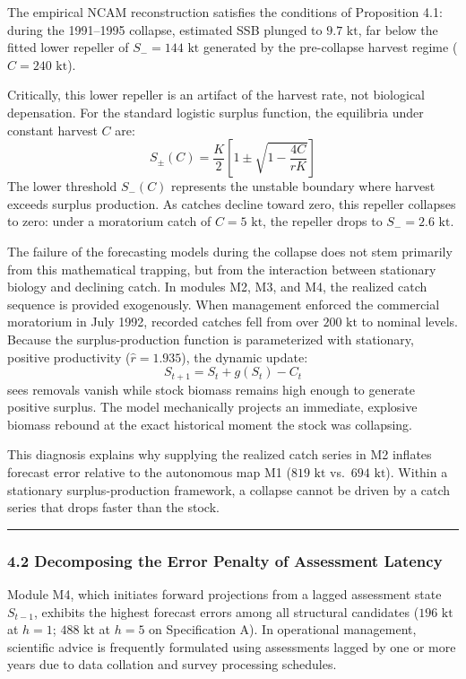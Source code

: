 \documentclass[11pt]{article}
\begin{document}
The empirical NCAM reconstruction satisfies the conditions of
Proposition 4.1: during the 1991--1995 collapse, estimated SSB plunged
to \(9.7\text{ kt}\), far below the fitted lower repeller of
\(S_- = 144\text{ kt}\) generated by the pre-collapse harvest regime
(\(C = 240\text{ kt}\)).

Critically, this lower repeller is an artifact of the harvest rate, not
biological depensation. For the standard logistic surplus function, the
equilibria under constant harvest \(C\) are:
\[S_\pm(C) = \frac{K}{2} \left[ 1 \pm \sqrt{1 - \frac{4C}{rK}} \right]\]
The lower threshold \(S_-(C)\) represents the unstable boundary where
harvest exceeds surplus production. As catches decline toward zero, this
repeller collapses to zero: under a moratorium catch of
\(C = 5\text{ kt}\), the repeller drops to \(S_- = 2.6\text{ kt}\).

The failure of the forecasting models during the collapse does not stem
primarily from this mathematical trapping, but from the interaction
between stationary biology and declining catch. In modules M2, M3, and
M4, the realized catch sequence is provided exogenously. When management
enforced the commercial moratorium in July 1992, recorded catches fell
from over \(200\text{ kt}\) to nominal levels. Because the
surplus-production function is parameterized with stationary, positive
productivity (\(\hat{r} = 1.935\)), the dynamic update:
\[S_{t+1} = S_t + g(S_t) - C_t\] sees removals vanish while stock
biomass remains high enough to generate positive surplus. The model
mechanically projects an immediate, explosive biomass rebound at the
exact historical moment the stock was collapsing.

This diagnosis explains why supplying the realized catch series in M2
inflates forecast error relative to the autonomous map M1
(\(819\text{ kt}\) vs.~\(694\text{ kt}\)). Within a stationary
surplus-production framework, a collapse cannot be driven by a catch
series that drops faster than the stock.

\begin{center}\rule{0.5\linewidth}{0.5pt}\end{center}

\subsubsection{4.2 Decomposing the Error Penalty of Assessment
Latency}\label{decomposing-the-error-penalty-of-assessment-latency}

Module M4, which initiates forward projections from a lagged assessment
state \(S_{t-1}\), exhibits the highest forecast errors among all
structural candidates (\(196\text{ kt}\) at \(h=1\); \(488\text{ kt}\)
at \(h=5\) on Specification A). In operational management, scientific
advice is frequently formulated using assessments lagged by one or more
years due to data collation and survey processing schedules.
\end{document}
